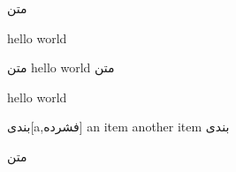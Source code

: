 
‌متن


    hello world

    ‌متن
        hello world
    ‌متن

    hello world

    ‌بندی[a,فشرده]
          an item
          another item
    ‌بندی

‌متن
